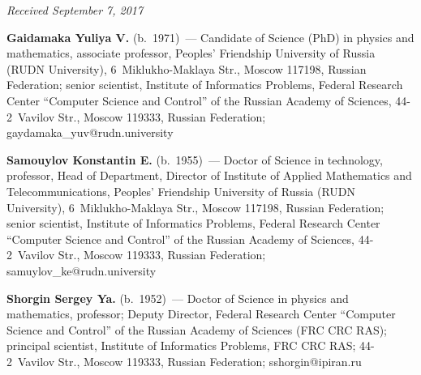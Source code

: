 \vspace*{-6pt}

\hfill{\small\textit{Received September 7, 2017}}


\Contr

\noindent
\textbf{Gaidamaka Yuliya V.} (b.\ 1971)~--- Candidate of Science (PhD) in physics and 
mathematics, associate professor, Peoples' Friendship University of Russia (RUDN University), 
6~Miklukho-Maklaya Str., Moscow 117198, Russian Federation; senior scientist, Institute of 
Informatics Problems, Federal Research Center ``Computer Science and Control'' of the Russian 
Academy of Sciences, 44-2~Vavilov Str., Moscow 119333, Russian Federation; 
\mbox{gaydamaka\_yuv@rudn.university}

\vspace*{3pt}

\noindent
\textbf{Samouylov Konstantin E.} (b.\ 1955)~--- Doctor of Science in technology, professor, 
Head of Department, 
Director of Institute of Applied Mathematics and Telecommunications, 
Peoples' Friendship University of Russia (RUDN University), 6~Miklukho-Maklaya Str., Moscow 
117198, Russian Federation; senior scientist,
 Institute of Informatics Problems, Federal Research 
Center ``Computer Science and Control'' of the Russian Academy of Sciences, 44-2~Vavilov Str., 
Moscow 119333, Russian Federation; \mbox{samuylov\_ke@rudn.university}

\vspace*{3pt}

\noindent
\textbf{Shorgin Sergey Ya.} (b.\ 1952)~--- Doctor of Science in physics and mathematics, 
professor; Deputy Director, Federal Research Center ``Computer Science and Control'' of the 
Russian Academy of Sciences (FRC CRC RAS); principal scientist, Institute of Informatics 
Problems, FRC CRC RAS; 44-2~Vavilov Str., Moscow 119333, Russian Federation; 
\mbox{sshorgin@ipiran.ru}

\label{end\stat}


\renewcommand{\bibname}{\protect\rm Литература} 